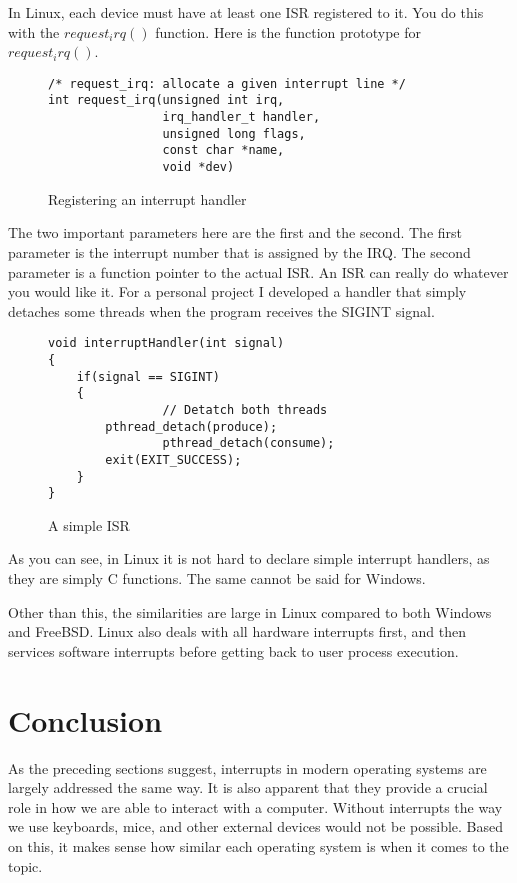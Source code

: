 \documentclass[letterpaper,10pt,titlepage,draftclsnofoot,onecolumn]{IEEEtran}
\begin{document}
In Linux, each device must have at least one ISR registered to it. You do this with the $request_irq()$ function. Here is the function prototype for $request_irq()$.

\begin{figure}[H]
\caption{Registering an interrupt handler}
\begin{lstlisting}
/* request_irq: allocate a given interrupt line */
int request_irq(unsigned int irq,
				irq_handler_t handler,
				unsigned long flags,
				const char *name,
				void *dev)
\end{lstlisting} \cite{linux}
\end{figure}

The two important parameters here are the first and the second. The first parameter is the interrupt number that is assigned by the IRQ. The second parameter is a function pointer to the actual ISR. An ISR can really do whatever you would like it. For a personal project I developed a handler that simply detaches some threads when the program receives the SIGINT signal. 

\begin{figure}[H]
\caption{A simple ISR}
\begin{lstlisting}
void interruptHandler(int signal)
{
	if(signal == SIGINT)
	{
                // Detatch both threads
		pthread_detach(produce);
                pthread_detach(consume);
		exit(EXIT_SUCCESS);
	}
}
\end{lstlisting}
\end{figure}

As you can see, in Linux it is not hard to declare simple interrupt handlers, as they are simply C functions. The same cannot be said for Windows. 

Other than this, the similarities are large in Linux compared to both Windows and FreeBSD. Linux also deals with all hardware interrupts first, and then services software interrupts before getting back to user process execution.  
\section{Conclusion}
As the preceding sections suggest, interrupts in modern operating systems are largely addressed the same way. It is also apparent that they provide a crucial role in how we are able to interact with a computer. Without interrupts the way we use keyboards, mice, and other external devices would not be possible. Based on this, it makes sense how similar each operating system is when it comes to the topic. 



\end{document}

